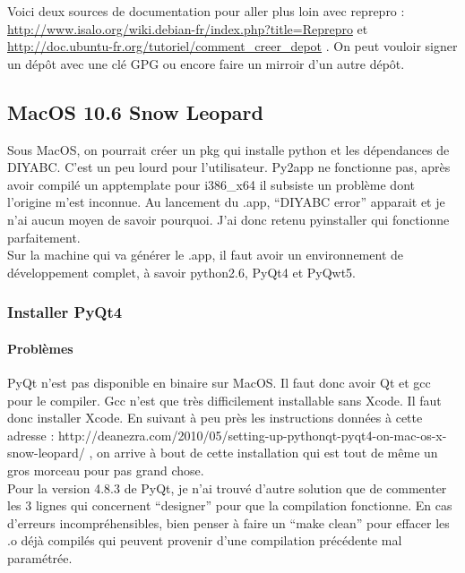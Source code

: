 \documentclass[12pt,a4paper]{article}
\begin{document}
        Voici deux sources de documentation pour aller plus loin avec reprepro
        :\newline
        \url{http://www.isalo.org/wiki.debian-fr/index.php?title=Reprepro}
        et\newline
        \url{http://doc.ubuntu-fr.org/tutoriel/comment_creer_depot} . On peut
        vouloir signer un dépôt avec une clé GPG ou encore faire un mirroir d'un
        autre dépôt.

    \subsection{MacOS 10.6 Snow Leopard}
        Sous MacOS, on pourrait cr\'eer un pkg qui installe python et les
        d\'ependances de DIYABC. C'est un peu lourd pour l'utilisateur. Py2app
        ne fonctionne pas, après avoir compil\'e un apptemplate pour i386\_x64
        il subsiste un problème dont l'origine m'est inconnue. Au lancement du
        .app, ``DIYABC error'' apparait et je n'ai aucun moyen de savoir
        pourquoi. J'ai donc retenu pyinstaller qui fonctionne parfaitement.\\

        Sur la machine qui va g\'en\'erer le .app, il faut avoir un
        environnement de d\'eveloppement complet, à savoir python2.6, PyQt4 et
        PyQwt5.

        \subsubsection{Installer PyQt4}

        \paragraph{Problèmes}

        PyQt n'est pas disponible en binaire sur MacOS. Il faut donc avoir Qt et
        gcc pour le compiler.  Gcc n'est que très difficilement installable sans
        Xcode. Il faut donc installer Xcode.  En suivant à peu près les
        instructions données à cette adresse : \newline
        http://deanezra.com/2010/05/setting-up-pythonqt-pyqt4-on-mac-os-x-snow-leopard/\newline
        , on arrive à bout de cette installation qui est tout de même un gros
        morceau pour pas grand chose.\\
    
        Pour la version 4.8.3 de PyQt, je n'ai trouvé d'autre solution que de
        commenter les 3 lignes qui concernent ``designer'' pour que la
        compilation fonctionne. En cas d'erreurs incompréhensibles, bien penser
        à faire un ``make clean'' pour effacer les .o déjà compilés qui peuvent
        provenir d'une compilation précédente mal paramétrée.
\end{document}
